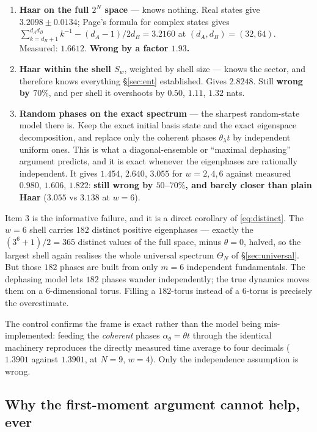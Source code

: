 \documentclass[11pt]{article}
\theoremstyle{plain}
\theoremstyle{definition}
\begin{document}
\begin{enumerate}
\item \textbf{Haar on the full $2^N$ space} --- knows nothing. Real states give
  $3.2098\pm0.0134$; Page's formula for complex states gives
  $\sum_{k=d_B+1}^{d_Ad_B}k^{-1}-(d_A-1)/2d_B=3.2160$ at $(d_A,d_B)=(32,64)$.
  Measured: $1.6612$. \textbf{Wrong by a factor $1.93$.}
\item \textbf{Haar within the shell $S_w$}, weighted by shell size --- knows the
  sector, and therefore knows everything \S\ref{sec:ent} established. Gives
  $2.8248$. Still \textbf{wrong by $70\%$}, and per shell it overshoots by
  $0.50$, $1.11$, $1.32$ nats.
\item \textbf{Random phases on the exact spectrum} --- the sharpest random-state
  model there is. Keep the exact initial basis state and the exact eigenspace
  decomposition, and replace only the coherent phases $\theta_\lambda t$ by
  independent uniform ones. This is what a diagonal-ensemble or ``maximal
  dephasing'' argument predicts, and it is exact whenever the eigenphases are
  rationally independent. It gives $1.454$, $2.640$, $3.055$ for $w=2,4,6$
  against measured $0.980$, $1.606$, $1.822$: \textbf{still wrong by $50$--$70\%$,
  and barely closer than plain Haar} ($3.055$ vs $3.138$ at $w=6$).
\end{enumerate}

Item 3 is the informative failure, and it is a direct corollary of
\eqref{eq:distinct}. The $w=6$ shell carries $182$ distinct positive
eigenphases --- exactly the $(3^6+1)/2=365$ distinct values of the full space,
minus $\theta=0$, halved, so the largest shell again realises the whole
universal spectrum $\Theta_N$ of \S\ref{sec:universal}. But those $182$ phases
are built from only $m=6$ independent fundamentals. The dephasing model lets
$182$ phases wander independently; the true dynamics moves them on a
$6$-dimensional torus. Filling a $182$-torus instead of a $6$-torus is precisely
the overestimate.

The control confirms the frame is exact rather than the model being
mis-implemented: feeding the \emph{coherent} phases $\alpha_\theta=\theta t$
through the identical machinery reproduces the directly measured time average to
four decimals ($1.3901$ against $1.3901$, at $N=9$, $w=4$). Only the
independence assumption is wrong.

\subsection{Why the first-moment argument cannot help, ever}
\end{document}
